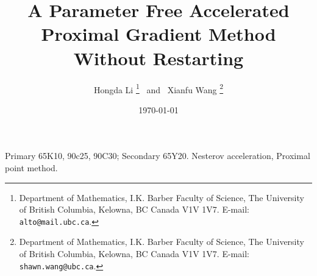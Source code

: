 \documentclass[12pt]{article}
\begin{document}
\title{{\selectfont 
        A Parameter Free Accelerated Proximal Gradient Method Without Restarting
    }}

\author{
    Hongda Li
    \thanks{Department of Mathematics, I.K. Barber Faculty of Science,
    The University of British Columbia, Kelowna, BC Canada V1V 1V7. E-mail:  \texttt{alto@mail.ubc.ca}.}~ and ~Xianfu Wang
    \thanks{Department of Mathematics, I.K. Barber Faculty of Science,
    The University of British Columbia, Kelowna, BC Canada V1V 1V7. E-mail:  \texttt{shawn.wang@ubc.ca}.}
}

\date{\today}

\maketitle


\begin{abstract} 
    \noindent
    
\end{abstract}

Primary 65K10, 90c25, 90C30; Secondary 65Y20. 
 Nesterov acceleration, Proximal point method. 
\end{document}

